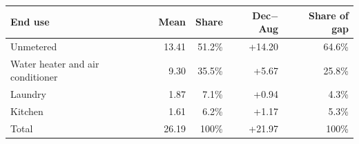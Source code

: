 \begin{tabular}{@{}lrrrr@{}}
\toprule
End use & Mean & Share & Dec$-$Aug & Share of gap \\
\midrule
Unmetered & 13.41 & 51.2\% & +14.20 & 64.6\% \\
Water heater and air conditioner & 9.30 & 35.5\% & +5.67 & 25.8\% \\
Laundry & 1.87 & 7.1\% & +0.94 & 4.3\% \\
Kitchen & 1.61 & 6.2\% & +1.17 & 5.3\% \\
Total & 26.19 & 100\% & +21.97 & 100\% \\
\bottomrule
\end{tabular}
